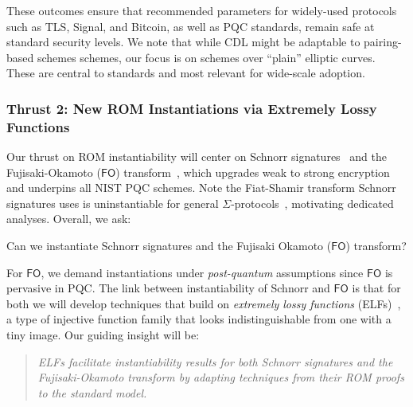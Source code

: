 \noindent These outcomes ensure that recommended parameters  for widely-used protocols such as TLS, Signal, and Bitcoin, as well as PQC standards, remain  safe at standard security levels.
We note that while CDL might be adaptable to pairing-based schemes schemes, our focus is on 
schemes over ``plain'' elliptic curves. These are central
to standards and
 most relevant for wide-scale adoption. %



\subsubsection{Thrust 2: New ROM Instantiations via  Extremely Lossy Functions}


 Our thrust on ROM instantiability will center on Schnorr signatures~\cite{C:Schnorr89} and the Fujisaki-Okamoto ($\mathsf{FO}$)  transform~\cite{JC:FujOka13}, which upgrades weak to strong encryption and underpins all NIST PQC schemes. Note the Fiat-Shamir transform Schnorr signatures uses is uninstantiable for general $\Sigma$-protocols~\cite{FOCS:GolKal03}, motivating dedicated analyses. Overall, we ask: %



\begin{ques}
    Can we instantiate Schnorr signatures and the Fujisaki Okamoto ($\mathsf{FO}$) transform?
\end{ques}

For $\mathsf{FO}$, we  demand instantiations under \emph{post-quantum} assumptions since $\mathsf{FO}$ is pervasive in PQC. The link between instantiability of Schnorr and $\mathsf{FO}$ is that for both  we will develop techniques that build on \emph{extremely lossy functions} (ELFs)~\cite{C:Zhandry16}, a type of  injective function family that looks indistinguishable from one with a tiny image. Our guiding insight  will be:
\begin{quote}
    \emph{ELFs facilitate   instantiability results for both Schnorr signatures and the Fujisaki-Okamoto transform by adapting  techniques from their ROM proofs to the \emph{standard model}.}
\end{quote}

